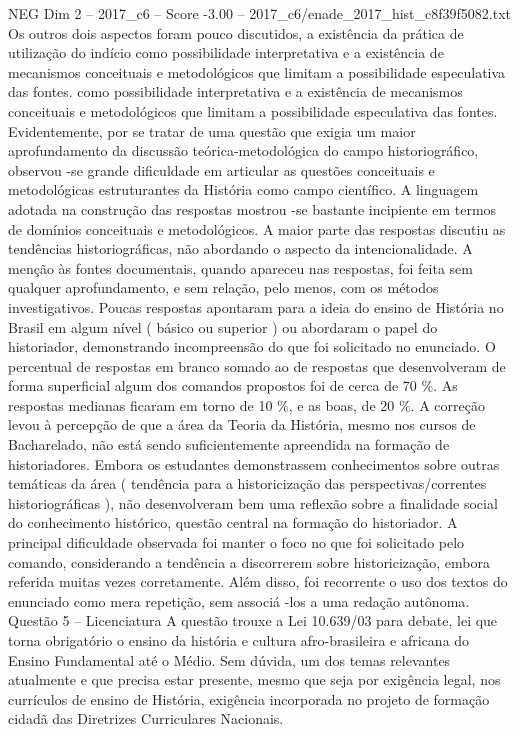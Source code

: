 \begin{textsample}{NEG Dim 2 – 2017\_c6 – Score -3.00 – 2017\_c6/enade\_2017\_hist\_c8f39f5082.txt}
Os outros dois aspectos foram pouco discutidos, a existência da prática de utilização do indício como possibilidade interpretativa e a existência de mecanismos conceituais e metodológicos que limitam a possibilidade especulativa das fontes. como possibilidade interpretativa e a existência de mecanismos conceituais e metodológicos que limitam a possibilidade especulativa das fontes.
Evidentemente, por se tratar de uma questão que exigia um maior aprofundamento da discussão teórica-metodológica do campo historiográfico, observou -se grande dificuldade em articular as questões conceituais e metodológicas estruturantes da História como campo científico.
A linguagem adotada na construção das respostas mostrou -se bastante incipiente em termos de domínios conceituais e metodológicos.
A maior parte das respostas discutiu as tendências historiográficas, não abordando o aspecto da intencionalidade.
A menção às fontes documentais, quando apareceu nas respostas, foi feita sem qualquer aprofundamento, e sem relação, pelo menos, com os métodos investigativos.
Poucas respostas apontaram para a ideia do ensino de História no Brasil em algum nível ( básico ou superior ) ou abordaram o papel do historiador, demonstrando incompreensão do que foi solicitado no enunciado.
O percentual de respostas em branco somado ao de respostas que desenvolveram de forma superficial algum dos comandos propostos foi de cerca de 70 \%.
As respostas medianas ficaram em torno de 10 \%, e as boas, de 20 \%.
A correção levou à percepção de que a área da Teoria da História, mesmo nos cursos de Bacharelado, não está sendo suficientemente apreendida na formação de historiadores.
Embora os estudantes demonstrassem conhecimentos sobre outras temáticas da área ( tendência para a historicização das perspectivas/correntes historiográficas ), não desenvolveram bem uma reflexão sobre a finalidade social do conhecimento histórico, questão central na formação do historiador.
A principal dificuldade observada foi manter o foco no que foi solicitado pelo comando, considerando a tendência a discorrerem sobre historicização, embora referida muitas vezes corretamente.
Além disso, foi recorrente o uso dos textos do enunciado como mera repetição, sem associá -los a uma redação autônoma.
Questão 5 – Licenciatura A questão trouxe a Lei 10.639/03 para debate, lei que torna obrigatório o ensino da história e cultura afro-brasileira e africana do Ensino Fundamental até o Médio.
Sem dúvida, um dos temas relevantes atualmente e que precisa estar presente, mesmo que seja por exigência legal, nos currículos de ensino de História, exigência incorporada no projeto de formação cidadã das Diretrizes Curriculares Nacionais.

\end{textsample}

